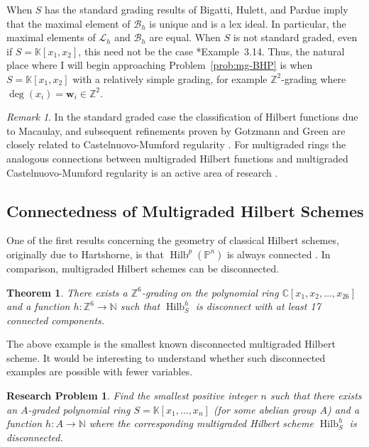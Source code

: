 \documentclass[11pt,reqno]{amsart}
\newtheorem{theorem}[lemma]{Theorem}
\newtheorem{problem}[lemma]{Research Problem}
\theoremstyle{remark}
\newtheorem{remark}[lemma]{Remark}
\newcommand{\Hilb}{\operatorname{Hilb}}
\newcommand{\ww}{\mathbf w}
\newcommand{\cB}{\mathcal{B}}
\newcommand{\cL}{\mathcal{L}}
\newcommand{\C}{\mathbb{C}}
\newcommand{\K}{\mathbb{K}}
\newcommand{\N}{\mathbb{N}}
\renewcommand{\P}{\mathbb{P}}
\newcommand{\Z}{\mathbb{Z}}
\begin{document}
When $S$ has the standard grading results of Bigatti, Hulett, and Pardue \cite{bigatti93,hulett93,pardue96} imply that the maximal element of $\cB_{h}$ is unique and is a lex ideal. In particular, the maximal elements of $\cL_{h}$ and $\cB_{h}$ are equal. When $S$ is not standard graded, even if $S=\K[x_{1},x_{2}]$, this need not be the case \cite{maclaganSmith10}*{Example~3.14}. Thus, the natural place where I will begin approaching Problem~\ref{prob:mg-BHP} is when $S=\K[x_{1},x_{2}]$ with a relatively simple grading, for example $\Z^{2}$-grading where $\deg(x_{i})=\ww_{i}\in\Z^2$.

 \begin{remark}\label{rem:mg-hilb-reg}
 In the standard graded case the classification of Hilbert functions due to Macaulay, and subsequent refinements proven by Gotzmann and Green are closely related to Castelnuovo-Mumford regularity \cite{gotzmann78,green88}. For multigraded rings the analogous connections between multigraded Hilbert functions and multigraded Castelnuovo-Mumford regularity is an active area of research \cite{maclaganSmith05,bruceHellerSayrafi21,bruceHellerSayrafi22}. %
\end{remark}


\subsection{Connectedness of Multigraded Hilbert Schemes}

One of the first results concerning the geometry of classical Hilbert schemes, originally due to Hartshorne, is that $\Hilb^{p}(\P^{n})$ is always connected \cite{hartshorne66}. In comparison, multigraded Hilbert schemes can be disconnected. 

\begin{theorem}\cite{santos05}
There exists a $\Z^{6}$-grading on the polynomial ring $\C[x_{1},x_{2},\ldots,x_{26}]$ and a function $h:\Z^{6}\to \N$ such that $\Hilb_{S}^{h}$ is disconnect with at least 17 connected components.
\end{theorem}

The above example is the smallest known disconnected multigraded Hilbert scheme. It would be interesting to understand whether such disconnected examples are possible with fewer variables. 

\begin{problem}\label{prob:disconnected}
	Find the smallest positive integer $n$ such that there exists an $A$-graded polynomial ring $S=\K[x_{1},\ldots,x_{n}]$ (for some abelian group $A$) and a function $h:A\to\N$ where the corresponding multigraded Hilbert scheme $\Hilb^{h}_{S}$ is disconnected.
\end{problem}
\end{document}
